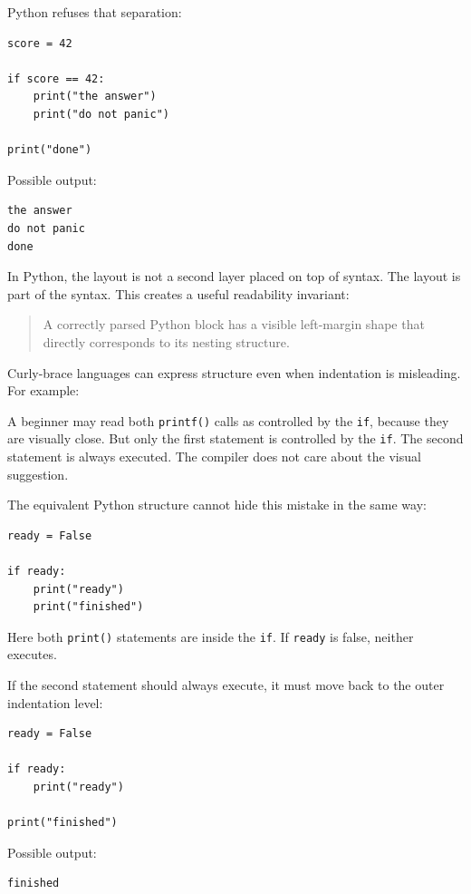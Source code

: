 Python refuses that separation:

\begin{verbatim}
score = 42

if score == 42:
    print("the answer")
    print("do not panic")

print("done")
\end{verbatim}

Possible output:

\begin{verbatim}
the answer
do not panic
done
\end{verbatim}

In Python, the layout is not a second layer placed on top of syntax. The layout is part of the syntax. This creates a useful readability invariant:

\begin{quote}
A correctly parsed Python block has a visible left-margin shape that directly corresponds to its nesting structure.
\end{quote}

Curly-brace languages can express structure even when indentation is misleading. For example:

A beginner may read both \texttt{printf()} calls as controlled by the \texttt{if}, because they are visually close. But only the first statement is controlled by the \texttt{if}. The second statement is always executed. The compiler does not care about the visual suggestion.

The equivalent Python structure cannot hide this mistake in the same way:

\begin{verbatim}
ready = False

if ready:
    print("ready")
    print("finished")
\end{verbatim}

Here both \texttt{print()} statements are inside the \texttt{if}. If \texttt{ready} is false, neither executes.

If the second statement should always execute, it must move back to the outer indentation level:

\begin{verbatim}
ready = False

if ready:
    print("ready")

print("finished")
\end{verbatim}

Possible output:

\begin{verbatim}
finished
\end{verbatim}


